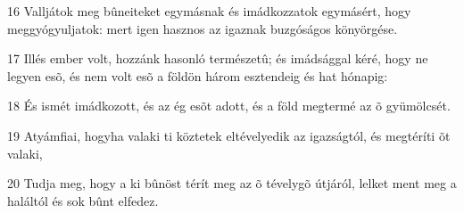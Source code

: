 \par 16 Valljátok meg bûneiteket egymásnak és imádkozzatok egymásért, hogy meggyógyuljatok: mert igen hasznos az  igaznak buzgóságos könyörgése.
\par 17 Illés ember volt, hozzánk hasonló természetû; és imádsággal kéré, hogy ne legyen esõ, és nem volt esõ a földön három esztendeig és hat hónapig:
\par 18 És ismét imádkozott, és az ég esõt adott, és a föld megtermé az õ gyümölcsét.
\par 19 Atyámfiai, hogyha valaki ti köztetek eltévelyedik az igazságtól, és megtéríti õt valaki,
\par 20 Tudja meg, hogy a ki bûnöst térít meg az õ tévelygõ útjáról, lelket ment meg a haláltól és  sok bûnt elfedez.


